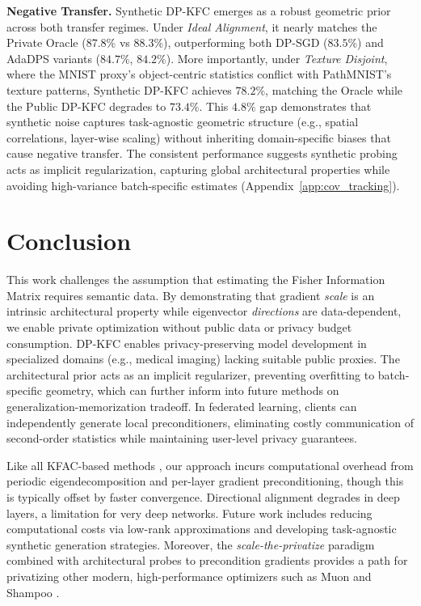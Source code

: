 \documentclass{article}
\theoremstyle{plain}
\theoremstyle{definition}
\theoremstyle{remark}
\begin{document}
\textbf{Negative Transfer.} Synthetic DP-KFC emerges as a robust geometric prior across both transfer regimes. Under \textit{Ideal Alignment}, it nearly matches the Private Oracle ($87.8\%$ vs $88.3\%$), outperforming both DP-SGD ($83.5\%$) and AdaDPS variants ($84.7\%$, $84.2\%$). More importantly, under \textit{Texture Disjoint}, where the MNIST proxy's object-centric statistics conflict with PathMNIST's texture patterns, Synthetic DP-KFC achieves $78.2\%$, matching the Oracle while the Public DP-KFC degrades to $73.4\%$. This $4.8\%$ gap demonstrates that synthetic noise captures task-agnostic geometric structure (e.g., spatial correlations, layer-wise scaling) without inheriting domain-specific biases that cause negative transfer. The consistent performance suggests synthetic probing acts as implicit regularization, capturing global architectural properties while avoiding high-variance batch-specific estimates (Appendix~\ref{app:cov_tracking}).


\section{Conclusion}
This work challenges the assumption that estimating the Fisher Information Matrix requires semantic data. By demonstrating that gradient \textit{scale} is an intrinsic architectural property while eigenvector \textit{directions} are data-dependent, we enable private optimization without public data or privacy budget consumption. DP-KFC enables privacy-preserving model development in specialized domains (e.g., medical imaging) lacking suitable public proxies. The architectural prior acts as an implicit regularizer, preventing overfitting to batch-specific geometry, which can further inform into future methods on generalization-memorization tradeoff. In federated learning, clients can independently generate local preconditioners, eliminating costly communication of second-order statistics while maintaining user-level privacy guarantees. 

Like all KFAC-based methods \cite{dangel2025kroneckerfactoredapproximatecurvaturekfac}, our approach incurs computational overhead from periodic eigendecomposition and per-layer gradient preconditioning, though this is typically offset by faster convergence. Directional alignment degrades in deep layers, a limitation for very deep networks. Future work includes reducing computational costs via low-rank approximations and developing task-agnostic synthetic generation strategies.  Moreover, the \textit{scale-the-privatize} paradigm combined with architectural probes to precondition gradients provides a path for privatizing other modern, high-performance optimizers such as Muon and Shampoo \cite{jordan2024muon, gupta2018shampoopreconditionedstochastictensor}.
\end{document}
